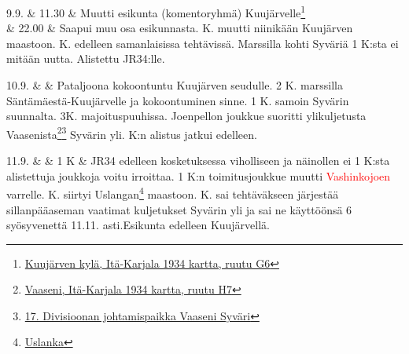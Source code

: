 \documentclass[11pt,a5paper,oneside]{book}
\begin{document}
\taulustop


9.9. & 11.30 & Muutti esikunta (komentoryhmä) Kuujärvelle\footnote{\href{https://www.google.fi/maps/place/Klub+Sela+Mikhaylovskoye/@61.0159198,33.731745,17z/}{Kuujärven kylä, Itä-Karjala 1934 kartta, ruutu G6}} \\

& 22.00 & Saapui muu osa esikunnasta. K. muutti niinikään Kuujärven maastoon. K. edelleen samanlaisissa tehtävissä. Marssilla kohti Syväriä 1 K:sta ei mitään uutta. Alistettu JR34:lle. \\

\newpage

10.9. & & Pataljoona kokoontuntu Kuujärven seudulle. 2 K. marssilla Säntämäestä-Kuujärvelle ja kokoontuminen sinne. 1 K. samoin Syvärin suunnalta. 3K. majoituspuuhissa. Joenpellon joukkue suoritti ylikuljetusta Vaasenista\footnote{\href{https://www.google.fi/maps/place/Vaaseni,+Leningradin+alue,+Ven\%C3\%A4j\%C3\%A4,+187742/@60.9621216,34.0129134,15z/}{Vaaseni, Itä-Karjala 1934 kartta, ruutu H7}}\footnote{\href{https://www.sotahistoriallisetkohteet.fi/app/sights/view/-/id/787/country/9/area/85/}{17. Divisioonan johtamispaikka Vaaseni Syväri}} Syvärin yli. K:n alistus jatkui edelleen.\\

\taulustop


11.9. & & 1 K \& JR34 edelleen kosketuksessa viholliseen ja näinollen ei 1 K:sta alistettuja joukkoja voitu irroittaa. 1 K:n toimitusjoukkue muutti \textcolor{red}{Vashinkojoen} varrelle.\newline{} K. siirtyi Uslangan\footnote{\href{https://www.google.fi/maps/place/6\%C2\%B058'32.7\%22N+33\%C2\%B054'02.8\%22E/@60.976793,33.8997559,17z/}{Uslanka}} maastoon.\newline{} K. sai tehtäväkseen järjestää sillanpääaseman vaatimat kuljetukset Syvärin yli ja sai ne käyttöönsä 6 syösyvenettä 11.11. asti.\newline\newline Esikunta edelleen Kuujärvellä. \\
\end{document}
